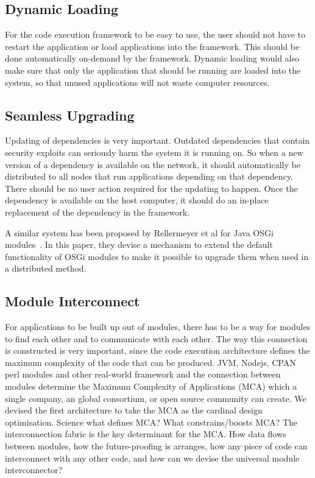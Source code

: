 \subsection{Dynamic Loading}

For the code execution framework to be easy to use, the user should not have to restart the application or load applications into the framework. This should be done automatically on-demand by the framework. Dynamic loading would also make sure that only the application that should be running are loaded into the system, so that unused applications will not waste computer resources.


\subsection{Seamless Upgrading}

Updating of dependencies is very important. Outdated dependencies that contain security exploits can seriously harm the system it is running on. So when a new version of a dependency is available on the network, it should automatically be distributed to all nodes that run applications depending on that dependency. There should be no user action required for the updating to happen. Once the dependency is available on the host computer, it should do an in-place replacement of the dependency in the framework.

A similar system has been proposed by Rellermeyer et al for Java OSGi modules~\cite{rellermeyer2008consistently}. In this paper, they devise a mechanism to extend the default functionality of OSGi modules to make it possible to upgrade them when used in a distributed method.

\subsection{Module Interconnect}

For applications to be built up out of modules, there has to be a way for modules to find each other and to communicate with each other. The way this connection is constructed is very important, since the code execution architecture defines the maximum complexity of the code that can be produced. JVM, Nodejs, CPAN perl modules and other real-world framework and the connection between modules determine the Maximum Complexity of Applications (MCA) which a single company, an global consortium, or open source community can create. We devised the first architecture to take the MCA as the cardinal design optimisation. Science what defines MCA? What constrains/boosts MCA? The interconnection fabric is the key determinant for the MCA. How data flows between modules, how the future-proofing is arranges, how any piece of code can interconnect with any other code, and how can we devise the universal module interconnector?

